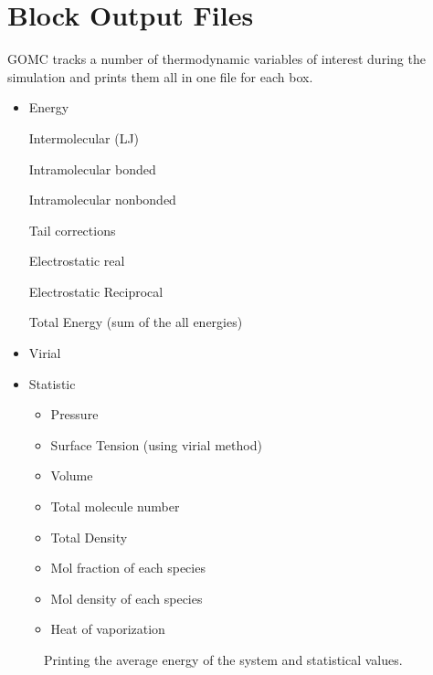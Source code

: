 \documentclass[letterpaper,10pt,english]{sphinxmanual}
\begin{document}
\section{Block Output Files}
\label{\detokenize{output_file:block-output-files}}
GOMC tracks a number of thermodynamic variables of interest during the simulation and prints them all in one file for each box.
\begin{itemize}
\item {} 
Energy

\textendash{} Intermolecular (LJ)

\textendash{} Intramolecular bonded

\textendash{} Intramolecular nonbonded

\textendash{} Tail corrections

\textendash{} Electrostatic real

\textendash{} Electrostatic Reciprocal

\textendash{} Total Energy (sum of the all energies)

\item {} 
Virial

\item {} 
Statistic
\begin{itemize}
\item {} 
Pressure

\item {} 
Surface Tension (using virial method)

\item {} 
Volume

\item {} 
Total molecule number

\item {} 
Total Density

\item {} 
Mol fraction of each species

\item {} 
Mol density of each species

\item {} 
Heat of vaporization

\end{itemize}

\end{itemize}

\begin{figure}[htbp]
\centering
\capstart

\noindent{}
\caption{Printing the average energy of the system and statistical values.}\label{\detokenize{output_file:id5}}\end{figure}
\end{document}
